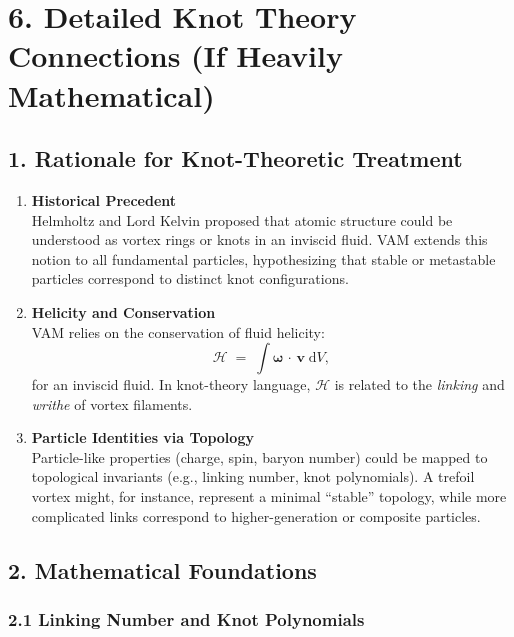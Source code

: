 

\section*{6. Detailed Knot Theory Connections (If Heavily Mathematical)}

\subsection*{1. Rationale for Knot-Theoretic Treatment}

\begin{enumerate}
    \item \textbf{Historical Precedent} \\
    Helmholtz and Lord Kelvin proposed that atomic structure could be understood as vortex rings or knots in an inviscid fluid. VAM extends this notion to all fundamental particles, hypothesizing that stable or metastable particles correspond to distinct knot configurations.
    \item \textbf{Helicity and Conservation} \\
    VAM relies on the conservation of fluid helicity:
    \[
        \mathcal{H}
        \;=\;
        \int
        \boldsymbol{\omega}\,\cdot\,\mathbf{v}\;\mathrm{d}V,
    \]
    for an inviscid fluid. In knot-theory language, \(\mathcal{H}\) is related to the \textit{linking} and \textit{writhe} of vortex filaments.
    \item \textbf{Particle Identities via Topology} \\
    Particle-like properties (charge, spin, baryon number) could be mapped to topological invariants (e.g., linking number, knot polynomials). A trefoil vortex might, for instance, represent a minimal “stable” topology, while more complicated links correspond to higher-generation or composite particles.
\end{enumerate}

\subsection*{2. Mathematical Foundations}

\subsubsection*{2.1 Linking Number and Knot Polynomials}

